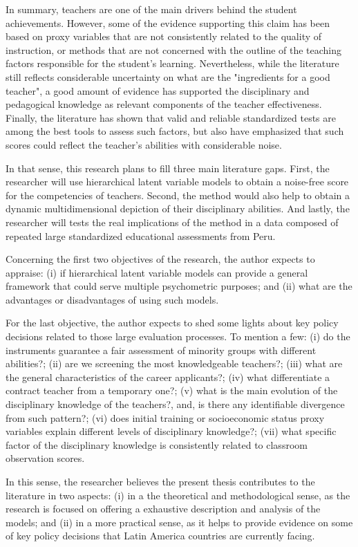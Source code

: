 In summary, teachers are one of the main drivers behind the student achievements. However, some of the evidence supporting this claim has been based on proxy variables that are not consistently related to the quality of instruction, or methods that are not concerned with the outline of the teaching factors responsible for the student's learning. Nevertheless, while the literature still reflects considerable uncertainty on what are the "ingredients for a good teacher", a good amount of evidence has supported the disciplinary and pedagogical knowledge as relevant components of the teacher effectiveness. Finally, the literature has shown that valid and reliable standardized tests are among the best tools to assess such factors, but also have emphasized that such scores could reflect the teacher's abilities with considerable noise.

In that sense, this research plans to fill three main literature gaps. First, the researcher will use hierarchical latent variable models to obtain a noise-free score for the competencies of teachers. Second, the method would also help to obtain a dynamic multidimensional depiction of their disciplinary abilities. And lastly, the researcher will tests the real implications of the method in a data composed of repeated large standardized educational assessments from Peru. 

Concerning the first two objectives of the research, the author expects to appraise: (i) if hierarchical latent variable models can provide a general framework that could serve multiple psychometric purposes; and (ii) what are the advantages or disadvantages of using such models.

For the last objective, the author expects to shed some lights about key policy decisions related to those large evaluation processes. To mention a few: (i) do the instruments guarantee a fair assessment of minority groups with different abilities?; (ii) are we screening the most knowledgeable teachers?; (iii) what are the general characteristics of the career applicants?; (iv) what differentiate a contract teacher from a temporary one?; (v) what is the main evolution of the disciplinary knowledge of the teachers?, and, is there any identifiable divergence from such pattern?; (vi) does initial training or socioeconomic status proxy variables explain different levels of disciplinary knowledge?; (vii) what specific factor of the disciplinary knowledge is consistently related to classroom observation scores.

In this sense, the researcher believes the present thesis contributes to the literature in two aspects: (i) in a the theoretical and methodological sense, as the research is focused on offering a exhaustive description and analysis of the models; and (ii) in a more practical sense, as it helps to provide evidence on some of key policy decisions that Latin America countries are currently facing.


